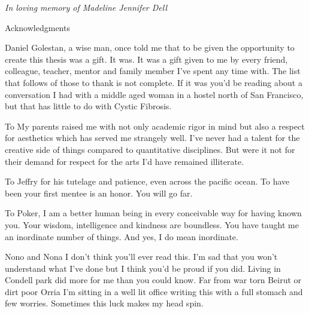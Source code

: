 \newpage


\thispagestyle{empty}


\begin{center}
	\vspace*{\fill}
\textit {In loving memory of Madeline Jennifer Dell} \\
	\vspace*{\fill}
\end{center}

\clearpage

\begin{center}
\begin{Large}
\begin{bfseries}
Acknowledgments
\end{bfseries}
\end{Large}
\end{center}
 Daniel Golestan, a wise man, once told me that to be given the opportunity to create this thesis was a gift. It was. It was a gift given to me by every friend, colleague, teacher, mentor and family member I've spent any time with. The list that follows of those to thank is not complete. If it was you'd be reading about a conversation I had with a middle aged woman in a hostel north of San Francisco, but that has little to do with Cystic Fibrosis. 

To My parents raised me with not only academic rigor in mind but also a respect for aesthetics which has served me strangely well. I've never had a talent for the creative side of things compared to quantitative disciplines. But were it not for their demand for respect for the arts I'd have remained illiterate. 

To Jeffry for his tutelage and patience, even across the pacific ocean. To have been your first mentee is an honor. You will go far. 

To Poker, I am a better human being in every conceivable way for having known you. Your wisdom, intelligence and kindness are boundless. You have taught me an inordinate number of things. And yes, I do mean inordinate. 

Nono and Nona I don't think you'll ever read this. I'm sad that you won't understand what I've done but I think you'd be proud if you did. Living in Condell park did more for me than you could know. Far from war torn Beirut or dirt poor Orria I'm sitting in a well lit office writing this with a full stomach and few worries. Sometimes this luck makes my head spin. 

